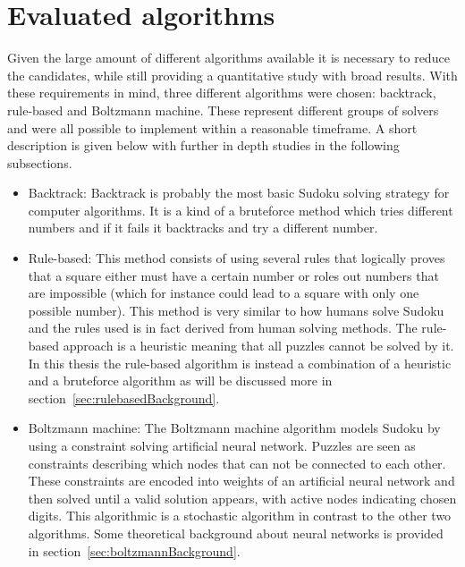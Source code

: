 \documentclass[a4paper,11pt]{kth-mag}
\begin{document}
\section{Evaluated algorithms}
Given the large amount of different algorithms available it is necessary to reduce the candidates, while still providing a quantitative study with broad results.
With these requirements in mind, three different algorithms were chosen: backtrack, rule-based and Boltzmann machine.
These represent different groups of solvers and were all possible to implement within a reasonable timeframe.
A short description is given below with further in depth studies in the following subsections.
\begin{itemize}
    \item Backtrack:
    Backtrack is probably the most basic Sudoku solving strategy for computer algorithms.
It is a kind of a bruteforce method which tries different numbers and if it fails it backtracks and try a different number.
    \item Rule-based:
    This method consists of using several rules that logically proves that a square either must have a certain number or roles out numbers that are impossible (which for instance could lead to a square with only one possible number).
This method is very similar to how humans solve Sudoku and the rules used is in fact derived from human solving methods.
The rule-based approach is a heuristic meaning that all puzzles cannot be solved by it. In this thesis the rule-based algorithm is instead a combination of a heuristic and a bruteforce algorithm as will be discussed more in section~\ref{sec:rulebasedBackground}.
    \item Boltzmann machine:
    The Boltzmann machine algorithm models Sudoku by using a constraint solving artificial neural network.
Puzzles are seen as constraints describing which nodes that can not be connected to each other.
These constraints are encoded into weights of an artificial neural network and then solved until a valid solution appears, with active nodes indicating chosen digits. 
This algorithmic is a stochastic algorithm in contrast to the other two algorithms. Some theoretical background about neural networks is provided in section~\ref{sec:boltzmannBackground}.
\end{itemize}

\FloatBarrier
\end{document}
